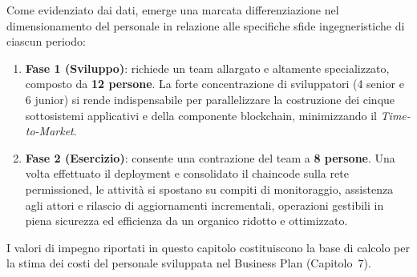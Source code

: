 \begin{table}[H]
\centering
\small
{}
\caption{Impegno annuale del personale in Anni-Persona}
\label{tab:riepilogo-ap}
\end{table}

Come evidenziato dai dati, emerge una marcata differenziazione nel dimensionamento del personale in relazione alle specifiche sfide ingegneristiche di ciascun periodo:

\begin{enumerate}
    \item \textbf{Fase 1 (Sviluppo)}: richiede un team allargato e altamente specializzato, composto da \textbf{12 persone}. La forte concentrazione di sviluppatori (4 senior e 6 junior) si rende indispensabile per parallelizzare la costruzione dei cinque sottosistemi applicativi e della componente blockchain, minimizzando il \textit{Time-to-Market}.
    \item \textbf{Fase 2 (Esercizio)}: consente una contrazione del team a \textbf{8 persone}. Una volta effettuato il deployment e consolidato il chaincode sulla rete permissioned, le attività si spostano su compiti di monitoraggio, assistenza agli attori e rilascio di aggiornamenti incrementali, operazioni gestibili in piena sicurezza ed efficienza da un organico ridotto e ottimizzato.
\end{enumerate}

I valori di impegno riportati in questo capitolo costituiscono la base di calcolo per la stima dei costi del personale sviluppata nel Business Plan (Capitolo~7).